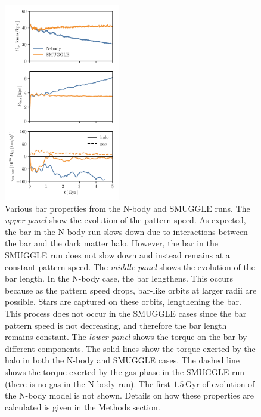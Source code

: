 \documentclass{natureprintstyle}
\begin{document}
\begin{figure}[h]%
\centering
\includegraphics[width=0.45\textwidth]{fig/fig2.pdf}
\caption{Various bar properties from the N-body and SMUGGLE runs. The
\textit{upper panel} show the evolution of the pattern speed. As expected, the
bar in the N-body run slows down due to interactions between the bar and the
dark matter halo. However, the bar in the SMUGGLE run does not slow down and
instead remains at a constant pattern speed. The \textit{middle panel} shows
the evolution of the bar length. In the N-body case, the bar lengthens. This
occurs because as the pattern speed drops, bar-like orbits at larger radii are
possible. Stars are captured on these orbits, lengthening the bar. This
process does not occur in the SMUGGLE cases since the bar pattern speed is not
decreasing, and therefore the bar length remains constant. The \textit{lower
panel} shows the torque on the bar by different components. The solid lines
show the torque exerted by the halo in both the N-body and SMUGGLE cases. The
dashed line shows the torque exerted by the gas phase in the SMUGGLE run
(there is no gas in the N-body run). The first $1.5\,\textrm{Gyr}$ of
evolution of the N-body model is not shown. Details on how these properties
are calculated is given in the Methods section.}\label{fig:prop}
\end{figure}
\end{document}

